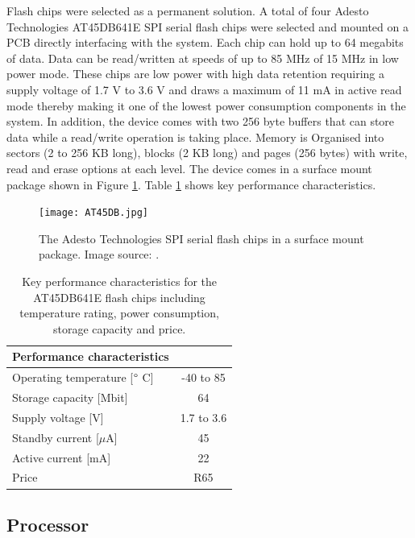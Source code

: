Flash chips were selected as a permanent solution. A total of four Adesto Technologies AT45DB641E SPI serial flash chips \cite{AT45DB641E} were selected and mounted on a PCB directly interfacing with the system. Each chip can hold up to 64 megabits of data. Data can be read/written at speeds of up to 85 MHz of 15 MHz in low power mode. These chips are low power with high data retention requiring a supply voltage of 1.7 V to 3.6 V and draws a maximum of 11 mA in active read mode thereby making it one of the lowest power consumption components in the system. In addition, the device comes with two 256 byte buffers that can store data while a read/write operation is taking place. Memory is Organised into sectors (2 to 256 KB long), blocks (2 KB long) and pages (256 bytes) with write, read and erase options at each level. The device comes in a surface mount package shown in Figure \ref{fig:flashAAHAH}. Table \ref{tab:flash_specs} shows key performance characteristics.

\begin{figure}[H]
	\centering
	\texttt{[image: AT45DB.jpg]}
	\caption{The Adesto Technologies SPI serial flash chips in a surface mount package. Image source: \cite{flashchipimage}.}
	\label{fig:flashAAHAH}
\end{figure}
\begin{table}[H]
	\centering
	\caption{Key performance characteristics for the AT45DB641E flash chips \cite{AT45DB641E} including temperature rating, power consumption, storage capacity and price.}
	\setlength{\extrarowheight}{5pt}
	\begin{tabular}{lc}
		\hline
		\textbf{Performance characteristics} &\\
		\hline
		\hline
		Operating temperature [$\degree$ C]  &  -40 to 85 \\
		\hline
		Storage capacity [Mbit] & 64 \\
		\hline
		Supply voltage [V]    & 1.7 to 3.6\\
		\hline
		Standby current [$\mu$A] & 45 \\
		\hline
		Active current [mA]  & 22 \\
		\hline
		Price   & R65\tablefootnote{Source: \url{https://za.rs-online.com/}}\\
		\hline
		\hline
	\end{tabular}
	\label{tab:flash_specs}
\end{table}

\subsection{Processor}

